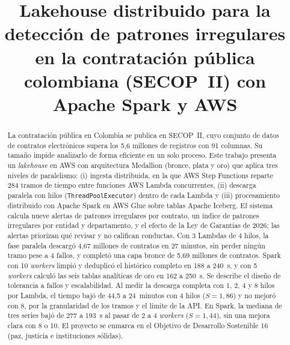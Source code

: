 \documentclass[conference]{IEEEtran}
\begin{document}
\title{Lakehouse distribuido para la detección de patrones irregulares en la contratación pública colombiana (SECOP~II) con Apache Spark y AWS}

\author{
}

\maketitle

\begin{abstract}
La contratación pública en Colombia se publica en SECOP~II, cuyo conjunto de datos de contratos electrónicos supera los 5,6 millones de registros con 91 columnas. Su tamaño impide analizarlo de forma eficiente en un solo proceso. Este trabajo presenta un \textit{lakehouse} en AWS con arquitectura Medallion (bronce, plata y oro) que aplica tres niveles de paralelismo: (i) ingesta distribuida, en la que AWS Step Functions reparte 284 tramos de tiempo entre funciones AWS Lambda concurrentes, (ii) descarga paralela con hilos (\texttt{ThreadPoolExecutor}) dentro de cada Lambda y (iii) procesamiento distribuido con Apache Spark en AWS Glue sobre tablas Apache Iceberg. El sistema calcula nueve alertas de patrones irregulares por contrato, un índice de patrones irregulares por entidad y departamento, y el efecto de la Ley de Garantías de 2026; las alertas priorizan qué revisar y no califican conductas. Con 3 Lambdas de 4 hilos, la fase paralela descargó 4,67 millones de contratos en 27 minutos, sin perder ningún tramo pese a 4 fallos, y completó una capa bronce de 5,69 millones de contratos. Spark con 10 \textit{workers} limpió y deduplicó el histórico completo en 188 a 240~s, y con 5 \textit{workers} calculó las seis tablas analíticas de oro en 162 a 250~s. Se describe el diseño de tolerancia a fallos y escalabilidad. Al medir la descarga completa con 1, 2, 4 y 8 hilos por Lambda, el tiempo bajó de 44,5 a 24~minutos con 4 hilos ($S = 1{,}86$) y no mejoró con 8, por la granularidad de los tramos y el límite de la API. En Spark, la mediana de tres series bajó de 277 a 193~s al pasar de 2 a 4 \textit{workers} ($S = 1{,}44$), sin una mejora clara con 8 o 10. El proyecto se enmarca en el Objetivo de Desarrollo Sostenible 16 (paz, justicia e instituciones sólidas).
\end{abstract}
\end{document}
